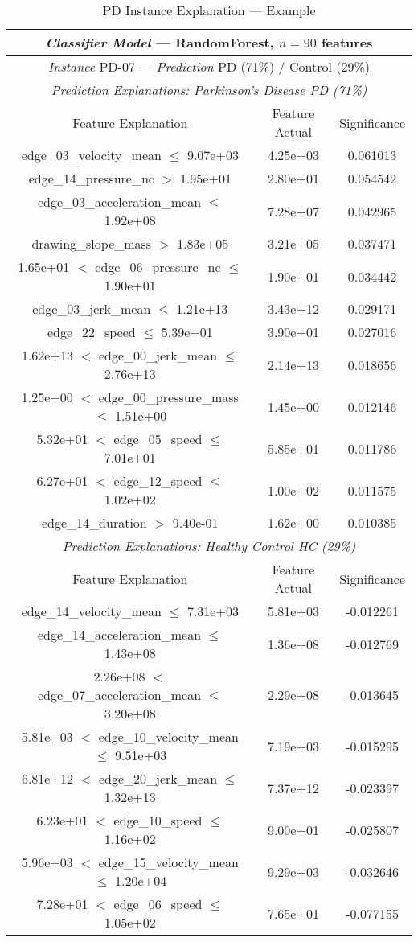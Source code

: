 \begin{table}[]
\centering
\begin{tabular}{ccc}
\toprule
\multicolumn{3}{c}{\textit{Classifier Model} --- RandomForest, $n=90$ features}\\
\midrule
\multicolumn{3}{c}{\textit{Instance} PD-07 --- \textit{Prediction} PD (71\%) / Control (29\%)}\\
\midrule
\multicolumn{3}{c}{\textit{Prediction Explanations: Parkinson's Disease PD (71\%)}}\\
Feature Explanation & Feature Actual & Significance \\
\toprule
 edge\_03\_velocity\_mean $\leq$ 9.07e+03 &  4.25e+03 &  0.061013 \\
 edge\_14\_pressure\_nc $>$ 1.95e+01 &  2.80e+01 &  0.054542 \\
 edge\_03\_acceleration\_mean $\leq$ 1.92e+08 &  7.28e+07 &  0.042965 \\
 drawing\_slope\_mass $>$ 1.83e+05 &  3.21e+05 &  0.037471 \\
 1.65e+01 $<$ edge\_06\_pressure\_nc $\leq$ 1.90e+01 &  1.90e+01 &  0.034442 \\
 edge\_03\_jerk\_mean $\leq$ 1.21e+13 &  3.43e+12 &  0.029171 \\
 edge\_22\_speed $\leq$ 5.39e+01 &  3.90e+01 &  0.027016 \\
 1.62e+13 $<$ edge\_00\_jerk\_mean $\leq$ 2.76e+13 &  2.14e+13 &  0.018656 \\
 1.25e+00 $<$ edge\_00\_pressure\_mass $\leq$ 1.51e+00 &  1.45e+00 &  0.012146 \\
 5.32e+01 $<$ edge\_05\_speed $\leq$ 7.01e+01 &  5.85e+01 &  0.011786 \\
 6.27e+01 $<$ edge\_12\_speed $\leq$ 1.02e+02 &  1.00e+02 &  0.011575 \\
 edge\_14\_duration $>$ 9.40e-01 &  1.62e+00 &  0.010385 \\
 \midrule
\multicolumn{3}{c}{\textit{Prediction Explanations: Healthy Control HC (29\%)}}\\
Feature Explanation & Feature Actual & Significance \\
\toprule
 edge\_14\_velocity\_mean $\leq$ 7.31e+03 &  5.81e+03 & -0.012261 \\
 edge\_14\_acceleration\_mean $\leq$ 1.43e+08 &  1.36e+08 & -0.012769 \\
 2.26e+08 $<$ edge\_07\_acceleration\_mean $\leq$ 3.20e+08 &  2.29e+08 & -0.013645 \\
 5.81e+03 $<$ edge\_10\_velocity\_mean $\leq$ 9.51e+03 &  7.19e+03 & -0.015295 \\
 6.81e+12 $<$ edge\_20\_jerk\_mean $\leq$ 1.32e+13 &  7.37e+12 & -0.023397 \\
 6.23e+01 $<$ edge\_10\_speed $\leq$ 1.16e+02 &  9.00e+01 & -0.025807 \\
 5.96e+03 $<$ edge\_15\_velocity\_mean $\leq$ 1.20e+04 &  9.29e+03 & -0.032646 \\
 7.28e+01 $<$ edge\_06\_speed $\leq$ 1.05e+02 &  7.65e+01 & -0.077155 \\
\bottomrule
\end{tabular}
\caption{PD Instance Explanation --- Example}
\label{explanation1}
\end{table}

